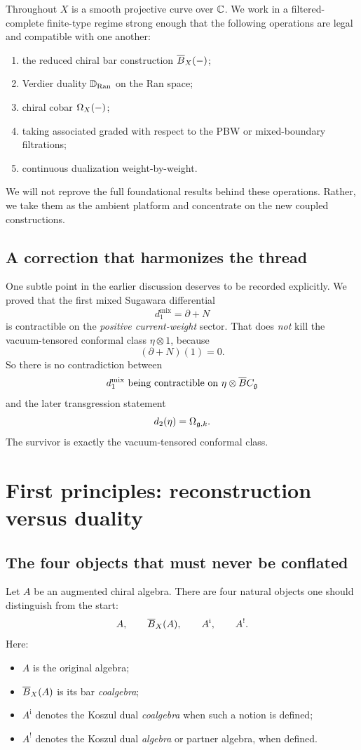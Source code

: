 Throughout \(X\) is a smooth projective curve over \(\mathbb C\). We work in a filtered-complete finite-type regime strong enough that the following operations are legal and compatible with one another:

\begin{enumerate}[label=\textup{(F\arabic*)},leftmargin=2.7em]
\item the reduced chiral bar construction \(\overline{B}_X(-)\);
\item Verdier duality \(\mathbb D_{\operatorname{Ran}}\) on the Ran space;
\item chiral cobar \(\Omega_X(-)\);
\item taking associated graded with respect to the PBW or mixed-boundary filtrations;
\item continuous dualization weight-by-weight.
\end{enumerate}

We will not reprove the full foundational results behind these operations. Rather, we take them as the ambient platform and concentrate on the new coupled constructions.

\subsection*{A correction that harmonizes the thread}
One subtle point in the earlier discussion deserves to be recorded explicitly. We proved that the first mixed Sugawara differential
\[
d_1^{\mathrm{mix}}=\partial+N
\]
is contractible on the \emph{positive current-weight} sector. That does \emph{not} kill the vacuum-tensored conformal class \(\eta\otimes 1\), because
\[
(\partial+N)(1)=0.
\]
So there is no contradiction between
\[
d_1^{\mathrm{mix}}\text{ being contractible on }\eta\otimes \overline{B} C_{\mathfrak g}
\]
and the later transgression statement
\[
d_2(\eta)=\Omega_{\mathfrak g,k}.
\]
The survivor is exactly the vacuum-tensored conformal class.

\section{First principles: reconstruction versus duality}

\subsection{The four objects that must never be conflated}

Let \(A\) be an augmented chiral algebra. There are four natural objects one should distinguish from the start:
\[
A,\qquad \overline{B}_X(A),\qquad A^{\mathrm{i}},\qquad A^{!}.
\]
Here:
\begin{itemize}[leftmargin=2em]
\item \(A\) is the original algebra;
\item \(\overline{B}_X(A)\) is its bar \emph{coalgebra};
\item \(A^{\mathrm{i}}\) denotes the Koszul dual \emph{coalgebra} when such a notion is defined;
\item \(A^!\) denotes the Koszul dual \emph{algebra} or partner algebra, when defined.
\end{itemize}

